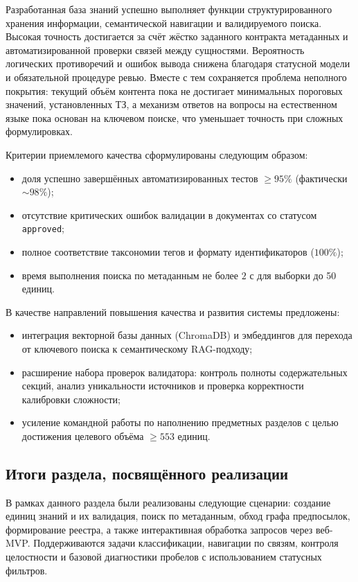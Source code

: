 Разработанная база знаний успешно выполняет функции структурированного хранения информации, семантической навигации и валидируемого поиска. Высокая точность достигается за счёт жёстко заданного контракта метаданных и автоматизированной проверки связей между сущностями. Вероятность логических противоречий и ошибок вывода снижена благодаря статусной модели и обязательной процедуре ревью. Вместе с тем сохраняется проблема неполного покрытия: текущий объём контента пока не достигает минимальных пороговых значений, установленных ТЗ, а механизм ответов на вопросы на естественном языке пока основан на ключевом поиске, что уменьшает точность при сложных формулировках.

Критерии приемлемого качества сформулированы следующим образом:
\begin{itemize}
    \item доля успешно завершённых автоматизированных тестов $\geq 95\%$ (фактически $\sim 98\%$);
    \item отсутствие критических ошибок валидации в документах со статусом \texttt{approved};
    \item полное соответствие таксономии тегов и формату идентификаторов ($100\%$);
    \item время выполнения поиска по метаданным не более $2$ с для выборки до 50 единиц.
\end{itemize}

В качестве направлений повышения качества и развития системы предложены:
\begin{itemize}
    \item интеграция векторной базы данных (ChromaDB) и эмбеддингов для перехода от ключевого поиска к семантическому RAG-подходу;
    \item расширение набора проверок валидатора: контроль полноты содержательных секций, анализ уникальности источников и проверка корректности калибровки сложности;
    \item усиление командной работы по наполнению предметных разделов с целью достижения целевого объёма $\geq 553$ единиц.
\end{itemize}

\subsection{Итоги раздела, посвящённого реализации}

В рамках данного раздела были реализованы следующие сценарии: создание единиц знаний и их валидация, поиск по метаданным, обход графа предпосылок, формирование реестра, а также интерактивная обработка запросов через веб-MVP. Поддерживаются задачи классификации, навигации по связям, контроля целостности и базовой диагностики пробелов с использованием статусных фильтров.

